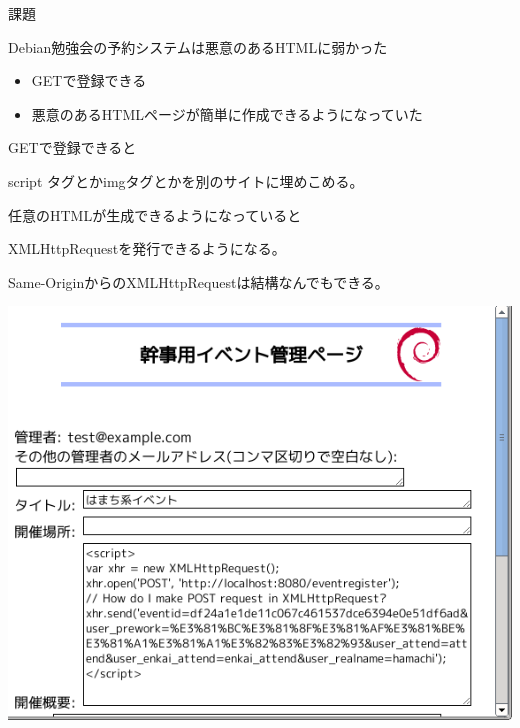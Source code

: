 \begin{frame}{課題}

Debian勉強会の予約システムは悪意のあるHTMLに弱かった

\begin{itemize}
 \item GETで登録できる
 \item 悪意のあるHTMLページが簡単に作成できるようになっていた
\end{itemize}

\end{frame}

\begin{frame}{GETで登録できると}
 
script タグとかimgタグとかを別のサイトに埋めこめる。

\end{frame}

\begin{frame}{任意のHTMLが生成できるようになっていると}
 
XMLHttpRequestを発行できるようになる。

Same-OriginからのXMLHttpRequestは結構なんでもできる。

\end{frame}

\begin{frame}{}
 
\includegraphics[width=\hsize]{image201201/xhr.png}
\end{frame}


